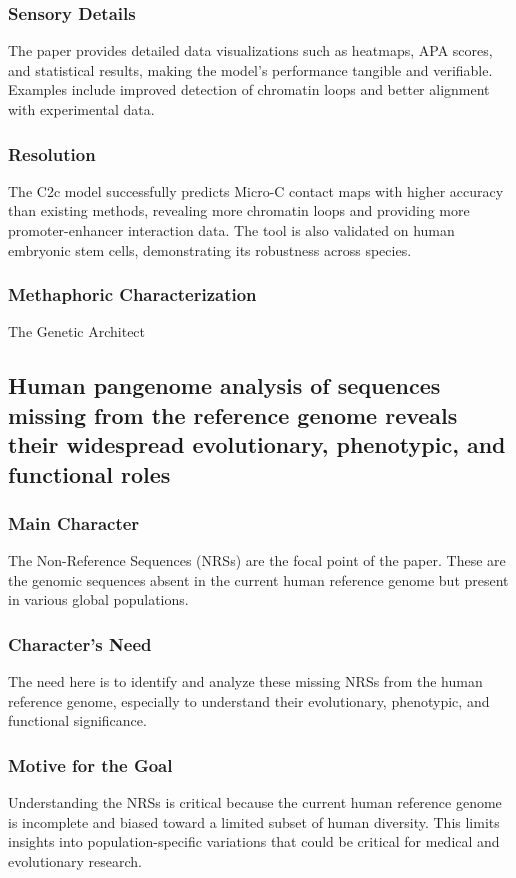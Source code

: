 \subsubsection{Sensory Details}
The paper provides detailed data visualizations such as heatmaps, APA scores, and statistical results, making the model's performance tangible and verifiable. Examples include improved detection of chromatin loops and better alignment with experimental data.
\subsubsection{Resolution}
The C2c model successfully predicts Micro-C contact maps with higher accuracy than existing methods, revealing more chromatin loops and providing more promoter-enhancer interaction data. The tool is also validated on human embryonic stem cells, demonstrating its robustness across species.

\subsubsection{Methaphoric Characterization}
The Genetic Architect

\subsection{Human pangenome analysis of sequences missing from the reference genome reveals their widespread evolutionary, phenotypic, and functional roles}
\subsubsection{Main Character}
The Non-Reference Sequences (NRSs) are the focal point of the paper. These are the genomic sequences absent in the current human reference genome but present in various global populations.
\subsubsection{Character's Need}
The need here is to identify and analyze these missing NRSs from the human reference genome, especially to understand their evolutionary, phenotypic, and functional significance.
\subsubsection{Motive for the Goal}
Understanding the NRSs is critical because the current human reference genome is incomplete and biased toward a limited subset of human diversity. This limits insights into population-specific variations that could be critical for medical and evolutionary research.
